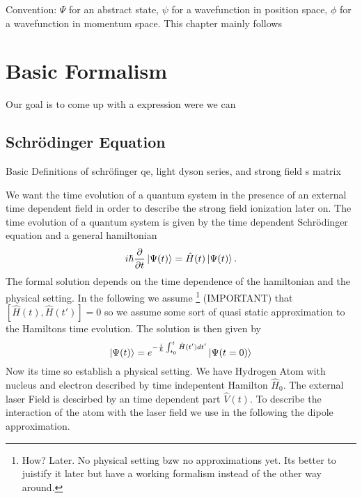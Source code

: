 Convention: $\Psi$ for an abstract state, $\psi$ for a wavefunction in position space, $\phi$  for a wavefunction in momentum space.
This chapter mainly follows \cite{Ivanov20012005} 



\section{Basic Formalism}
Our goal is to come up with a expression were we can 


\subsection{Schrödinger Equation}

Basic Definitions of schröfinger qe, light dyson series, and strong field s matrix

We want the time evolution of a quantum system in the presence of an external time dependent field in order to describe the strong field ionization later on.
The time evolution of a quantum system is given by the time dependent Schrödinger equation and a general hamiltonian
\begin{equation}
    i \hbar \frac{\partial}{\partial t} \ket{\Psi(t)} = \hat{H}(t) \ket{\Psi(t)}. \label{eq:schroedinger}
\end{equation}
The formal solution depends on the time dependence of the hamiltonian and the physical setting. 
In the following we assume \footnote{How? Later. No physical setting bzw no approximations yet. Its better to juistify it later but have a working formalism instead of the other way around.} (IMPORTANT) that $[\hat{H}(t), \hat{H}(t')] = 0$ so we assume some sort of quasi static approximation to the Hamiltons time evolution. 
The solution is then given by 
\begin{equation}
    \ket{\Psi(t)} = e^{-\frac{i}{\hbar} \int_{t_0}^{t} \hat{H}(t') dt'} \ket{\Psi(t=0)}
\end{equation}
Now its time so establish a physical setting. We have Hydrogen Atom with nucleus and electron described by time indepentent Hamilton $\hat{H}_0$. 
The external laser Field is descirbed by an time dependent part $\hat{V}(t)$. To describe the interaction of the atom with the laser field we use in the following the dipole approximation.




\newpage
